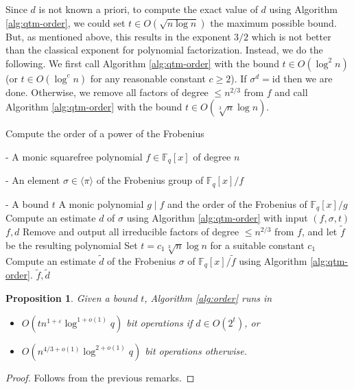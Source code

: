 \documentclass[12pt]{article}
\theoremstyle{plain}
\newtheorem{proposition}[theorem]{Proposition}
\theoremstyle{definition}
\newcommand{\algbox}[1]{
	\begin{tcolorbox}[width = 0.8\textwidth, colback = white, arc = 2pt, boxrule = 0.5pt] 
		#1 
	\end{tcolorbox}
}
\newcommand{\lrang}[1]{\langle#1\rangle}
\def\F{\ensuremath{\mathbb{F}}}
\begin{document}
Since $d$ is not known a priori, to compute the exact value of $d$ using Algorithm 
\ref{alg:qtm-order}, we could set $t \in O(\sqrt{n \log n})$ the maximum possible bound. But, as 
mentioned above, this results in the exponent $3 / 2$ which is not better than the classical 
exponent for polynomial factorization. Instead, we do the following. We first call Algorithm 
\ref{alg:qtm-order} with the bound $t \in O(\log^2n)$ (or $t \in O(\log^cn)$ for any reasonable 
constant $c \ge 2$). If $\sigma^d = \text{id}$ then we are done. Otherwise, we remove all factors 
of degree $\le n^{2 / 3}$ from $f$ and call Algorithm \ref{alg:qtm-order} with the bound $t \in 
O(\sqrt[3]{n} \log n)$. 

\begin{algorithm}[t]
	\caption{Compute the order of a power of the Frobenius}
	\label{alg:order}
	\centering
	\algbox{
	\begin{algorithmic}[1]
		\Require 
		\item[-] A monic squarefree polynomial $f \in \F_q[x]$ of degree $n$
		\item[-] An element $\sigma \in \lrang{\pi}$ of the Frobenius group of $\F_q[x] / f$
		\item[-] A bound $t$
		\Ensure A monic polynomial $g \mid f$ and the order of the Frobenius of $\F_q[x] / g$
		\State Compute an estimate $d$ of $\sigma$ using Algorithm \ref{alg:qtm-order} with input 
		$(f, \sigma, t)$
		\If {$\sigma^d = \text{id}$}
			\State \Return $f, d$
		\EndIf
		\State Remove and output all irreducible factors of degree $\le n^{2 / 3}$ from 
		$f$, and let $\tilde{f}$ be the resulting polynomial
		\State Set $t = c_1\sqrt[3]{n} \log n$ for a suitable constant $c_1$
		\State Compute an estimate $\tilde{d}$ of the Frobenius $\sigma$ of $\F_q[x] / \tilde{f}$ 
		using Algorithm \ref{alg:qtm-order}.
		\State \Return $\tilde{f}, \tilde{d}$
	\end{algorithmic}}
\end{algorithm}

\begin{proposition}
	\label{prop:exact-d}
	Given a bound $t$, Algorithm \ref{alg:order} runs in
	\begin{itemize}
		\item $O(tn^{1 + \varepsilon}\log^{1 + o(1)}q)$ bit operations if $d \in O(2^t)$, or
		\item $O(n^{4 / 3 + o(1)}\log^{2 + o(1)}q)$ bit operations otherwise.
	\end{itemize}
\end{proposition}
\begin{proof}
	Follows from the previous remarks.
\end{proof}
\end{document}
